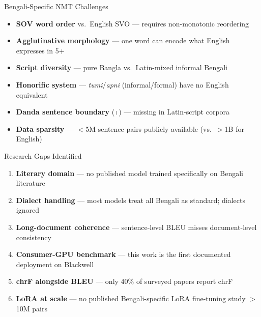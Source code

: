 \documentclass[aspectratio=169,10pt]{beamer}
\begin{document}
\begin{frame}{Bengali-Specific NMT Challenges}
  \begin{itemize}
    \item \textbf{SOV word order} vs.\ English SVO --- requires non-monotonic reordering
    \item \textbf{Agglutinative morphology} --- one word can encode what English expresses in 5+
    \item \textbf{Script diversity} --- pure Bangla vs.\ Latin-mixed informal Bengali
    \item \textbf{Honorific system} --- \textit{tumi}/\textit{apni} (informal/formal) have no English equivalent
    \item \textbf{Danda sentence boundary} (\texttt{।}) --- missing in Latin-script corpora
    \item \textbf{Data sparsity} --- $<$5M sentence pairs publicly available (vs.\ $>$1B for English)
  \end{itemize}
\end{frame}

\begin{frame}{Research Gaps Identified}
  \begin{enumerate}
    \item \textbf{Literary domain} --- no published model trained specifically on Bengali literature
    \item \textbf{Dialect handling} --- most models treat all Bengali as standard; dialects ignored
    \item \textbf{Long-document coherence} --- sentence-level BLEU misses document-level consistency
    \item \textbf{Consumer-GPU benchmark} --- this work is the first documented deployment on Blackwell
    \item \textbf{chrF alongside BLEU} --- only 40\% of surveyed papers report chrF
    \item \textbf{LoRA at scale} --- no published Bengali-specific LoRA fine-tuning study $>$ 10M pairs
  \end{enumerate}
\end{frame}
\end{document}
